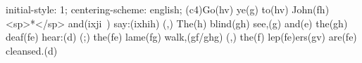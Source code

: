 initial-style: 1;
centering-scheme: english;
(c4)Go(hv) ye(g) to(hv) John(fh) <sp>*</sp> and(ixji~) say:(ixhih) (,) The(h) blind(gh) see,(g) and(e) the(gh) deaf(fe) hear:(d) (;) the(fe) lame(fg) walk,(gf/ghg) (,) the(f) lep(fe)ers(gv) are(fe) cleansed.(d)
